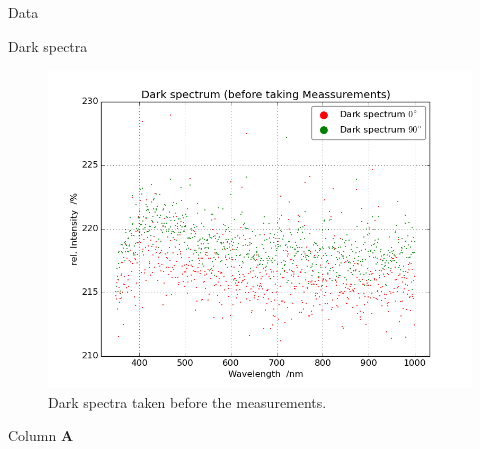 \begin{appendix}
  \label{Appendix}
  
  
  
  \begin{chapter}{Data}
    \label{Appendix:Data}
    
    
    
    \begin{section}{Dark spectra}
      \label{Appendix:DarkSpectra}
      
      \begin{figure}[ht!]
        \centering
        \includegraphics[width=\textwidth]{Figures/Darkspec.png}
        \caption{Dark spectra taken before the measurements.}
        \label{fig:DarkSpectra}
      \end{figure}
      
    \end{section}
    
    
    
    \newpage
    \begin{section}{Column \textbf{A}}
      \label{Appendix:DataA}
      

\end{section}
\end{chapter}
\end{appendix}
